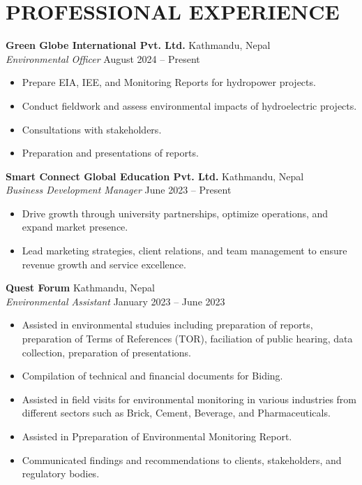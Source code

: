 \documentclass[a4paper, 11pt]{extarticle}
\begin{document}
\vspace{5pt}

\section*{PROFESSIONAL EXPERIENCE}
\noindent
\textbf{Green Globe International Pvt. Ltd.} \hfill Kathmandu, Nepal\\[2pt] 
\textit{Environmental Officer} \hfill  August 2024 -- Present
\begin{itemize}
    \item Prepare EIA, IEE, and Monitoring Reports for hydropower projects.
    \item Conduct fieldwork and assess environmental impacts of hydroelectric projects.
    \item Consultations with stakeholders.
    \item Preparation and presentations of reports.
\end{itemize}

\vspace{5pt}

\noindent
\textbf{Smart Connect Global Education Pvt. Ltd.} \hfill Kathmandu, Nepal\\[2pt] 
\textit{Business Development Manager} \hfill June 2023 -- Present
\begin{itemize}
    \item Drive growth through university partnerships, optimize operations, and expand market presence.
    \item Lead marketing strategies, client relations, and team management to ensure revenue growth and service excellence.
\end{itemize}

\vspace{5pt}

\noindent
\textbf{Quest Forum} \hfill Kathmandu, Nepal\\[2pt] 
\textit{Environmental Assistant} \hfill January 2023 -- June 2023
\begin{itemize}
    \item Assisted in environmental studuies including preparation of reports, preparation of Terms of References (TOR), faciliation of public hearing, data collection, preparation of presentations.
    \item Compilation of technical and financial documents for Biding.
    \item Assisted in field visits for environmental monitoring in various industries from different sectors such as Brick, Cement, Beverage, and Pharmaceuticals.
    \item Assisted in Ppreparation of Environmental Monitoring Report.
    \item Communicated findings and recommendations to clients, stakeholders, and regulatory bodies.
\end{itemize}
\end{document}
